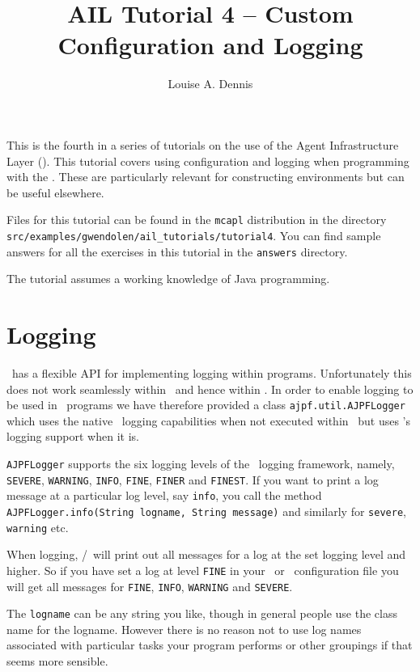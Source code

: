 \documentclass[a4]{article}
\author{Louise A. Dennis}
\title{AIL Tutorial 4 -- Custom Configuration and Logging}
\begin{document}
\maketitle
This is the fourth in a series of tutorials on the use of the Agent Infrastructure Layer (\ail).  This tutorial covers using configuration and logging when programming with the \ail.  These are particularly relevant for constructing environments but can be useful elsewhere.

Files for this tutorial can be found in the \texttt{mcapl} distribution in the directory \texttt{src/examples/gwendolen/ail\_tutorials/tutorial4}.  You can find sample answers for all the exercises in this tutorial in the \texttt{answers} directory.

The tutorial assumes a working knowledge of Java programming.

\section{Logging}
\java\ has a flexible API for implementing logging within programs.  Unfortunately this does not work seamlessly within \jpf\ and hence within \ajpf.  In order to enable logging to be used in \ail\ programs we have therefore provided a class \texttt{ajpf.util.AJPFLogger} which uses the native \java\ logging capabilities when not executed within \ajpf\ but uses \jpf's logging support when it is.

\begin{sloppypar}
\texttt{AJPFLogger} supports the six logging levels of the \java\ logging framework, namely, \texttt{SEVERE}, \texttt{WARNING}, \texttt{INFO}, \texttt{FINE}, \texttt{FINER} and \texttt{FINEST}.  If you want to print a log message at a particular log level, say \texttt{info}, you call the method \texttt{AJPFLogger.info(String logname, String message)} and similarly for \texttt{severe}, \texttt{warning} etc.
\end{sloppypar}

When logging, \java/\jpf\ will print out all messages for a log at the set logging level and higher.  So if you have set a log at level \texttt{FINE} in your \ail\ or \jpf\ configuration file you will get all messages for \texttt{FINE}, \texttt{INFO}, \texttt{WARNING} and \texttt{SEVERE}.

The \texttt{logname} can be any string you like, though in general people use the class name for the logname.  However there is no reason not to use log names associated with particular tasks your program performs or other groupings if that seems more sensible.
\end{document}

